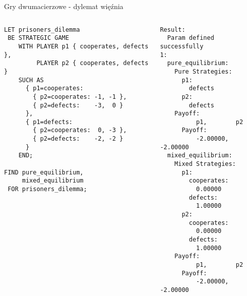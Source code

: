 \documentclass[xcolor=x11names,compress]{beamer}
\renewcommand{\(}{\begin{columns}}
\renewcommand{\)}{\end{columns}}
\newcommand{\<}[1]{\begin{column}{#1}}
\renewcommand{\>}{\end{column}}
\begin{document}
\begin{frame}[fragile]{Gry dwumacierzowe - dylemat więźnia}
\begin{columns}[c]
\begin{column}{.5\textwidth}
\begin{lstlisting}
LET prisoners_dilemma
 BE STRATEGIC GAME
    WITH PLAYER p1 { cooperates, defects },
         PLAYER p2 { cooperates, defects }
    SUCH AS
      { p1=cooperates:
        { p2=cooperates: -1, -1 },
        { p2=defects:    -3,  0 }
      },
      { p1=defects:
        { p2=cooperates:  0, -3 },
        { p2=defects:    -2, -2 }
      }
    END;

FIND pure_equilibrium,
     mixed_equilibrium
 FOR prisoners_dilemma;
\end{lstlisting}
\end{column}
\vrule
\begin{column}{.5\textwidth}
\begin{lstlisting}
Result:
  Param defined successfully
1:
  pure_equilibrium:
    Pure Strategies:
      p1:
        defects
      p2:
        defects
    Payoff:
          p1,        p2
      Payoff:
          -2.00000,  -2.00000
  mixed_equilibrium:
    Mixed Strategies:
      p1:
        cooperates:
          0.00000
        defects:
          1.00000
      p2:
        cooperates:
          0.00000
        defects:
          1.00000
    Payoff:
          p1,        p2
      Payoff:
          -2.00000,  -2.00000
\end{lstlisting}
\end{column}
\end{columns}
\end{frame}

\end{document}
